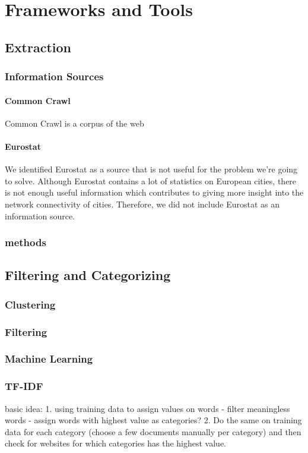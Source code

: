 \section{Frameworks and Tools}

\subsection{Extraction}
\subsubsection{Information Sources}

\paragraph{Common Crawl}
Common Crawl \cite{commoncrawl} is a corpus of the web

\paragraph{Eurostat}
We identified Eurostat as a source that is not useful for the problem we're going to solve. Although Eurostat contains a lot of statistics on European cities, there is not enough useful information which contributes to giving more insight into the network connectivity of cities. Therefore, we did not include Eurostat as an information source.
\subsubsection{methods}

\subsection{Filtering and Categorizing}

\subsubsection{Clustering}
\subsubsection{Filtering}
\subsubsection{Machine Learning}
\subsubsection{TF-IDF}
basic idea: 1. using training data to assign values on words - filter meaningless words - assign words with highest value as categories? 2. Do the same on training data for each category (choose a few documents manually per category) and then check for websites for which categories has the highest value.

